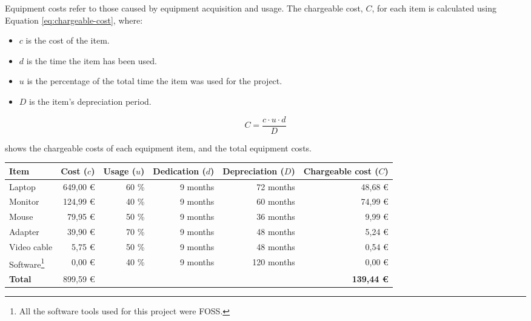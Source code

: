 Equipment costs refer to those caused by equipment acquisition and usage. The chargeable cost, $C$, for each item is calculated using Equation \eqref{eq:chargeable-cost}, where:
\begin{itemize}
  \item $c$ is the cost of the item.
  \item $d$ is the time the item has been used.
  \item $u$ is the percentage of the total time the item was used for the project.
  \item $D$ is the item's depreciation period.
\end{itemize}

\begin{equation}\label{eq:chargeable-cost}
  C = \frac{c \cdot u \cdot d}{D}
\end{equation}

 shows the chargeable costs of each equipment item, and the total equipment costs.

\begin{table}[htb]
    {
      \begin{adjustbox}{max width=\textwidth}  %
        \begin{tabular}{lrrrrr}
          \toprule
          \textbf{Item} & \textbf{Cost ($c$)} & \textbf{Usage ($u$)} & \textbf{Dedication ($d$)} & \textbf{Depreciation ($D$)} & \textbf{Chargeable cost ($C$)}   \\
          \midrule
          Laptop      & 649,00 € & 60 \% & 9 months &  72 months &  48,68 € \\
          Monitor     & 124,99 € & 40 \% & 9 months &  60 months &  74,99 € \\
          Mouse       &  79,95 € & 50 \% & 9 months &  36 months &   9,99 € \\
          Adapter     &  39,90 € & 70 \% & 9 months &  48 months &   5,24 € \\
          Video cable &   5,75 € & 50 \% & 9 months &  48 months &   0,54 € \\
          Software\footnote{All the software tools used for this project were \gls{FOSS}.}
                      &   0,00 € & 40 \% & 9 months & 120 months &   0,00 € \\
          \midrule
          \textbf{Total}
                      & 899,59 € &       &          &           &\textbf{139,44 €} \\
          \bottomrule
        \end{tabular}
      \end{adjustbox}
    }
\end{table}


